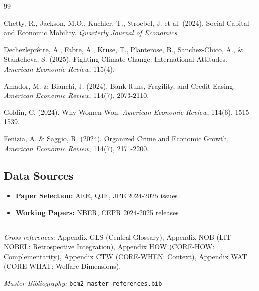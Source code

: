\begin{thebibliography}{99}

 Chetty, R., Jackson, M.O., Kuchler, T., Stroebel, J. et al. (2024). Social Capital and Economic Mobility. \textit{Quarterly Journal of Economics}.

 Dechezleprêtre, A., Fabre, A., Kruse, T., Planterose, B., Sanchez-Chico, A., \& Stantcheva, S. (2025). Fighting Climate Change: International Attitudes. \textit{American Economic Review}, 115(4).

 Amador, M. \& Bianchi, J. (2024). Bank Runs, Fragility, and Credit Easing. \textit{American Economic Review}, 114(7), 2073-2110.

 Goldin, C. (2024). Why Women Won. \textit{American Economic Review}, 114(6), 1515-1539.

 Fenizia, A. \& Saggio, R. (2024). Organized Crime and Economic Growth. \textit{American Economic Review}, 114(7), 2171-2200.

\end{thebibliography}

\subsection{Data Sources}

\begin{itemize}[nosep]
    \item \textbf{Paper Selection:} AER, QJE, JPE 2024-2025 issues
    \item \textbf{Working Papers:} NBER, CEPR 2024-2025 releases
\end{itemize}



\vspace{1em}
\hrule
\vspace{0.5em}

\noindent\textit{Cross-references:}
Appendix GLS (Central Glossary),
Appendix NOB (LIT-NOBEL: Retrospective Integration),
Appendix HOW (CORE-HOW: Complementarity),
Appendix CTW (CORE-WHEN: Context),
Appendix WAT (CORE-WHAT: Welfare Dimensions).

\noindent\textit{Master Bibliography:} \texttt{bcm2\_master\_references.bib}


